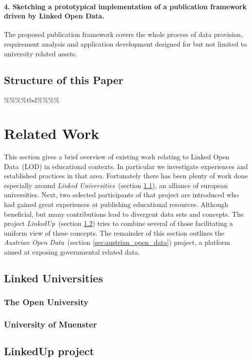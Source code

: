 \documentclass{article}
\begin{document}
\paragraph{4. Sketching a prototypical implementation of a publication framework driven by Linked Open Data.}
The proposed publication framework covers the whole process of data provision, requirement analysis and application development designed for but not limited to university related assets.  
\subsection{Structure of this Paper}
\%\%\%\%tbd\%\%\%\%

\section{Related Work}
This section gives a brief overview of existing work relating to Linked Open Data~(LOD) in educational contexts. In particular we investigate experiences and established practices in that area. Fortunately there has been plenty of work done especially around \textit{Linked Universities}~(section \ref{sec:linked_universities}), an alliance of european universities. Next, two selected participants of that project are introduced who had gained great experiences at publishing educational resources. Although beneficial, but many contributions lead to divergent data sets and concepts. The project \textit{LinkedUp}~(section \ref{sec:linkedup}) tries to combine several of those facilitating a uniform view of these concepts. The remainder of this section outlines the \textit{Austrian Open Data}~(section \ref{sec:austrian_open_data}) project, a platform aimed at exposing governmental related data. 
\subsection{Linked Universities}
\label{sec:linked_universities}
\subsubsection{The Open University}

\subsubsection{University of Muenster}

\subsection{LinkedUp project}
\label{sec:linkedup}
\end{document}
